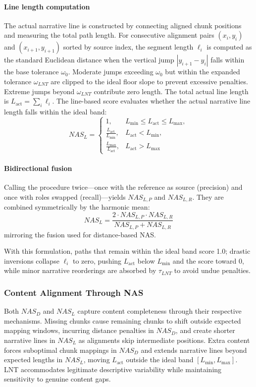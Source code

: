 \documentclass[main.tex]{subfiles}
\begin{document}
\paragraph{Line length computation}
The actual narrative line is constructed by connecting aligned chunk positions and measuring the total path length. For consecutive alignment pairs $(x_i, y_i)$ and $(x_{i+1}, y_{i+1})$ sorted by source index, the segment length $\ell_i$ is computed as the standard Euclidean distance when the vertical jump $|y_{i+1} - y_i|$ falls within the base tolerance $\omega_0$. Moderate jumps exceeding $\omega_0$ but within the expanded tolerance $\omega_{LNT}$ are clipped to the ideal floor slope to prevent excessive penalties. Extreme jumps beyond $\omega_{LNT}$ contribute zero length. The total actual line length is $L_{\text{act}} = \sum_i \ell_i$. The line-based score evaluates whether the actual narrative line length falls within the ideal band:
\begin{equation}
NAS_L = \begin{cases}
1, & L_{\min} \leq L_{\text{act}} \leq L_{\max}, \\
\frac{L_{\text{act}}}{L_{\min}}, & L_{\text{act}} < L_{\min}, \\
\frac{L_{\max}}{L_{\text{act}}}, & L_{\text{act}} > L_{\max}
\end{cases}
\end{equation}

\paragraph{Bidirectional fusion}
Calling the procedure twice—once with the reference as source (precision) and once with roles swapped (recall)—yields $NAS_{L,P}$ and $NAS_{L,R}$. They are combined symmetrically by the harmonic mean:
\begin{equation}
NAS_L = \frac{2 \cdot NAS_{L,P} \cdot NAS_{L,R}}{NAS_{L,P} + NAS_{L,R}}
\end{equation}
mirroring the fusion used for distance-based NAS.

With this formulation, paths that remain within the ideal band score 1.0; drastic inversions collapse $\ell_i$ to zero, pushing $L_{\text{act}}$ below $L_{\min}$ and the score toward 0, while minor narrative reorderings are absorbed by $\tau_{LNT}$ to avoid undue penalties.

\subsubsection{Content Alignment Through NAS}
Both $NAS_D$ and $NAS_L$ capture content completeness through their respective mechanisms. Missing chunks cause remaining chunks to shift outside expected mapping windows, incurring distance penalties in $NAS_D$, and create shorter narrative lines in $NAS_L$ as alignments skip intermediate positions. Extra content forces suboptimal chunk mappings in $NAS_D$ and extends narrative lines beyond expected lengths in $NAS_L$, moving $L_{\text{act}}$ outside the ideal band $[L_{\min}, L_{\max}]$. LNT accommodates legitimate descriptive variability while maintaining sensitivity to genuine content gaps.
\end{document}
